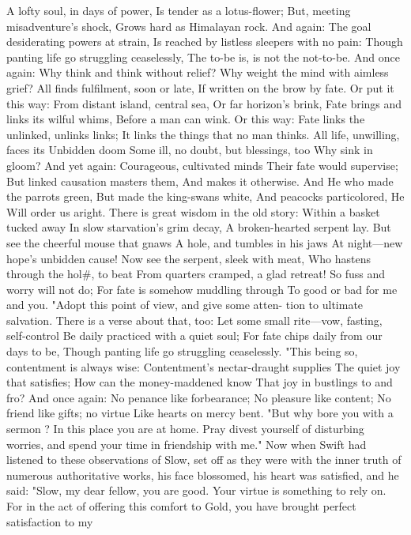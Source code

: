 \documentclass{book}
\begin{document}
A lofty soul, in days of power,
Is tender as a lotus-flower;
But, meeting misadventure's shock,
Grows hard as Himalayan rock.
And again:
The goal desiderating powers at strain,
Is reached by listless sleepers with no pain:
Though panting life go struggling ceaselessly,
The to-be is, is not the not-to-be.
And once again:
Why think and think without relief?
Why weight the mind with aimless grief?
All finds fulfilment, soon or late,
If written on the brow by fate.
Or put it this way:
From distant island, central sea,
Or far horizon's brink,
Fate brings and links its wilful whims,
Before a man can wink.
Or this way:
Fate links the unlinked, unlinks links;
It links the things that no man thinks.
All life, unwilling, faces its
Unbidden doom
Some ill, no doubt, but blessings, too
Why sink in gloom?
And yet again:
Courageous, cultivated minds
Their fate would supervise;
But linked causation masters them,
And makes it otherwise.
And He who made the parrots green,
But made the king-swans white,
And peacocks particolored, He
Will order us aright.
There is great wisdom in the old story:
Within a basket tucked away
In slow starvation's grim decay,
A broken-hearted serpent lay.
But see the cheerful mouse that gnaws
A hole, and tumbles in his jaws
At night---new hope's unbidden cause!
Now see the serpent, sleek with meat,
Who hastens through the hol#, to beat
From quarters cramped, a glad retreat!
So fuss and worry will not do;
For fate is somehow muddling through
To good or bad for me and you.
"Adopt this point of view, and give some atten-
tion to ultimate salvation. There is a verse about
that, too:
Let some small rite---vow, fasting, self-control
Be daily practiced with a quiet soul;
For fate chips daily from our days to be,
Though panting life go struggling ceaselessly.
"This being so, contentment is always wise:
Contentment's nectar-draught supplies
The quiet joy that satisfies;
How can the money-maddened know
That joy in bustlings to and fro?
And once again:
No penance like forbearance;
No pleasure like content;
No friend like gifts; no virtue
Like hearts on mercy bent.
"But why bore you with a sermon ? In this place
you are at home. Pray divest yourself of disturbing
worries, and spend your time in friendship with me."
Now when Swift had listened to these observations
of Slow, set off as they were with the inner truth of
numerous authoritative works, his face blossomed,
his heart was satisfied, and he said: "Slow, my dear
fellow, you are good. Your virtue is something to
rely on. For in the act of offering this comfort to
Gold, you have brought perfect satisfaction to my
\end{document}
